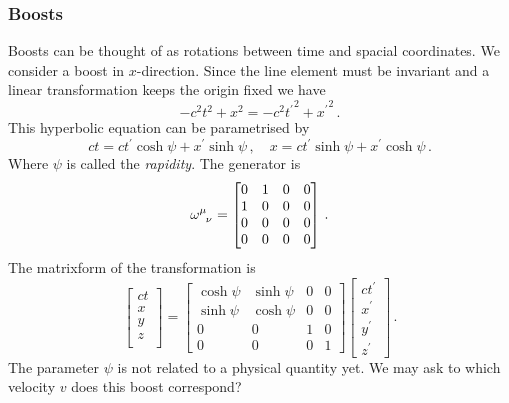 \subsubsection*{Boosts}
Boosts can be thought of as rotations between time and spacial coordinates. We
consider a boost in $x$-direction. Since the line element must be invariant and
a linear transformation keeps the origin fixed we have
\begin{equation}
    -c^2t^2+x^2=-c^2{t^\prime}^2+{x^\prime}^2\, .
\end{equation}
This hyperbolic equation can be parametrised by
\begin{equation}
    ct = ct^\prime\cosh\psi+x^\prime\sinh\psi\,, \quad x =
    ct^\prime\sinh\psi+x^\prime\cosh\psi\, .
\end{equation}
Where $\psi$ is called the \emph{rapidity}.
The generator is
\begin{equation}
    \tensor{\omega}{^\mu_\nu}
    =
    \begin{bmatrix}
        0&1 & 0&0\\
        1&0 &0&0\\
        0&0&0 &0\\
        0&0 &0 &0
    \end{bmatrix}\,.
\end{equation}
The matrixform of the transformation is
\begin{equation}
    \begin{bmatrix}
        ct\\
        x\\
        y\\
        z\\
    \end{bmatrix}=
    \begin{bmatrix}
        \cosh\psi&\sinh\psi & 0&0\\
        \sinh\psi&\cosh\psi &0&0\\
        0&0&1 &0\\
        0&0 &0 &1
    \end{bmatrix}
    \begin{bmatrix}
        ct^\prime\\
        x^\prime\\
        y^\prime\\
        z^\prime
    \end{bmatrix}\, .
\end{equation}
The parameter $\psi$ is not related to a physical quantity yet. We may ask to which
velocity $v$ does this boost correspond?
